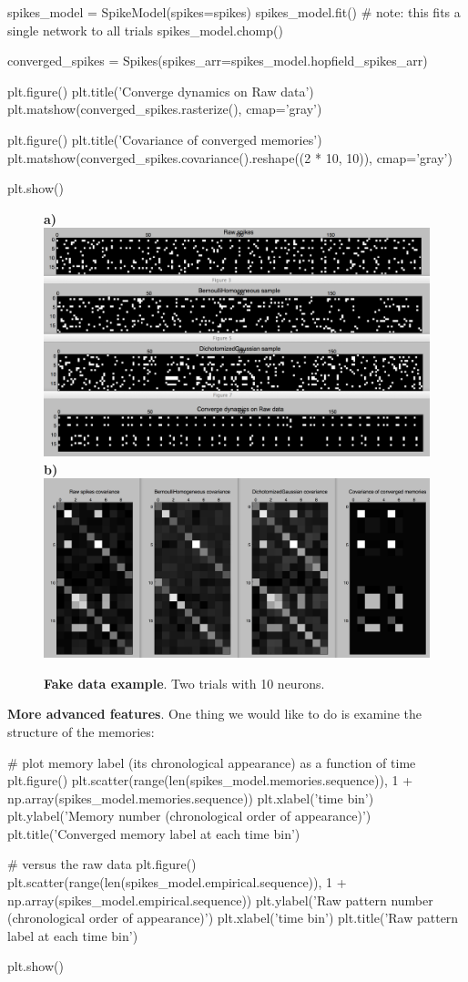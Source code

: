 \documentclass[letter, 12pt]{article}
\theoremstyle{definition}
\theoremstyle{remark}
\begin{document}
\begin{python}
spikes_model = SpikeModel(spikes=spikes)
spikes_model.fit()  # note: this fits a single network to all trials
spikes_model.chomp()

converged_spikes = Spikes(spikes_arr=spikes_model.hopfield_spikes_arr)

plt.figure()
plt.title('Converge dynamics on Raw data')
plt.matshow(converged_spikes.rasterize(), cmap='gray')

plt.figure()
plt.title('Covariance of converged memories')
plt.matshow(converged_spikes.covariance().reshape((2 * 10, 10)), cmap='gray')

plt.show()
\end{python}
 
\begin{figure}
\begin{center}
\textbf{a)}\includegraphics[width=.41\linewidth]{demo_fake_spikes.png} 
\textbf{b)}\includegraphics[width=.53\linewidth]{cov_demo.png} 
\caption{\textbf{Fake data example}. Two trials with 10 neurons.}
\label{fake_ex_fig}
\vspace{-.8cm}
\end{center}
\end{figure}

\textbf{More advanced features}.  One thing we would like to do is examine the structure of the memories:

\begin{python}
# plot memory label (its chronological appearance) as a function of time
plt.figure()
plt.scatter(range(len(spikes_model.memories.sequence)),
		1 + np.array(spikes_model.memories.sequence))
plt.xlabel('time bin')
plt.ylabel('Memory number (chronological order of appearance)')
plt.title('Converged memory label at each time bin')

# versus the raw data
plt.figure()
plt.scatter(range(len(spikes_model.empirical.sequence)),
		1 + np.array(spikes_model.empirical.sequence))
plt.ylabel('Raw pattern number (chronological order of appearance)')
plt.xlabel('time bin')
plt.title('Raw pattern label at each time bin')

plt.show()
\end{python}
 
\end{document}
